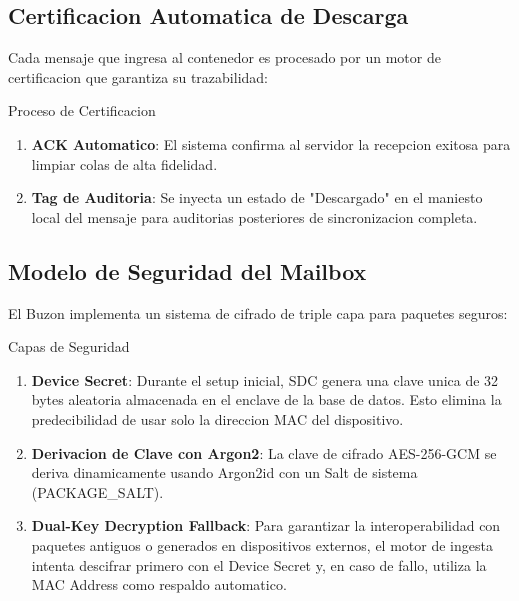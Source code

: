 
\subsection{Certificacion Automatica de Descarga}

Cada mensaje que ingresa al contenedor es procesado por un motor de certificacion que garantiza su trazabilidad:

\begin{caja}{Proceso de Certificacion}
\begin{enumerate}
\item \textbf{ACK Automatico}: El sistema confirma al servidor la recepcion exitosa para limpiar colas de alta fidelidad.
\item \textbf{Tag de Auditoria}: Se inyecta un estado de "Descargado" en el mani\-esto local del mensaje para auditorias posteriores de sincronizacion completa.
\end{enumerate}
\end{caja}


\subsection{Modelo de Seguridad del Mailbox}

El Buzon implementa un sistema de cifrado de triple capa para paquetes seguros:

\begin{caja}{Capas de Seguridad}
\begin{enumerate}
\item \textbf{Device Secret}: Durante el setup inicial, SDC genera una clave unica de 32 bytes aleatoria almacenada en el enclave de la base de datos. Esto elimina la predecibilidad de usar solo la direccion MAC del dispositivo.

\item \textbf{Derivacion de Clave con Argon2}: La clave de cifrado AES-256-GCM se deriva dinamicamente usando Argon2id con un Salt de sistema (PACKAGE\_SALT).

\item \textbf{Dual-Key Decryption Fallback}: Para garantizar la interoperabilidad con paquetes antiguos o generados en dispositivos externos, el motor de ingesta intenta descifrar primero con el Device Secret y, en caso de fallo, utiliza la MAC Address como respaldo automatico.
\end{enumerate}
\end{caja}

